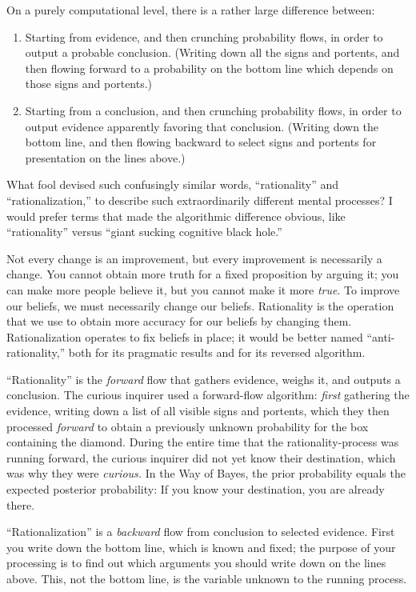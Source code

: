 {
 On a purely computational level, there is a rather large
difference between:}

\begin{enumerate}
\item {
 Starting from evidence, and then crunching probability flows, in
order to output a probable conclusion. (Writing down all the signs and
portents, and then flowing forward to a probability on the bottom line
which depends on those signs and portents.)}

\item {
 Starting from a conclusion, and then crunching probability flows,
in order to output evidence apparently favoring that conclusion.
(Writing down the bottom line, and then flowing backward to select
signs and portents for presentation on the lines above.)}
\end{enumerate}

{
 What fool devised such confusingly similar words,
``rationality'' and
``rationalization,'' to describe
such extraordinarily different mental processes? I would prefer terms
that made the algorithmic difference obvious, like
``rationality'' versus
``giant sucking cognitive black
hole.''}

{
 Not every change is an improvement, but every improvement is
necessarily a change. You cannot obtain more truth for a fixed
proposition by arguing it; you can make more people believe it, but you
cannot make it more \textit{true}. To improve our beliefs, we must
necessarily change our beliefs. Rationality is the operation that we
use to obtain more accuracy for our beliefs by changing them.
Rationalization operates to fix beliefs in place; it would be better
named ``anti-rationality,'' both for
its pragmatic results and for its reversed algorithm.}

{
 ``Rationality'' is the
\textit{forward} flow that gathers evidence, weighs it, and outputs a
conclusion. The curious inquirer used a forward-flow algorithm:
\textit{first} gathering the evidence, writing down a list of all
visible signs and portents, which they then processed \textit{forward}
to obtain a previously unknown probability for the box containing the
diamond. During the entire time that the rationality-process was
running forward, the curious inquirer did not yet know their
destination, which was why they were \textit{curious.} In the Way of
Bayes, the prior probability equals the expected posterior probability:
If you know your destination, you are already there.}

{
 ``Rationalization'' is a
\textit{backward} flow from conclusion to selected evidence. First you
write down the bottom line, which is known and fixed; the purpose of
your processing is to find out which arguments you should write down on
the lines above. This, not the bottom line, is the variable unknown to
the running process.}

